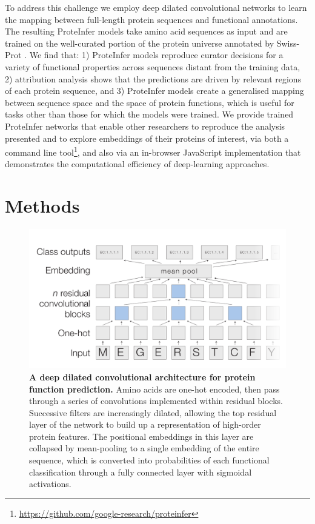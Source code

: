 To address this challenge we employ deep dilated convolutional networks to learn the mapping between full-length protein sequences and functional annotations. The resulting ProteInfer models take amino acid sequences as input and are trained on the well-curated portion of the protein universe annotated by Swiss-Prot \cite{uniprotlatest}. We find that: 1) ProteInfer models reproduce curator decisions for a  variety of functional properties across sequences distant from the training data, 2) attribution analysis shows that the predictions are driven by relevant regions of each protein sequence, and 3) ProteInfer models create a generalised mapping between sequence space and the space of protein functions, which is useful for tasks other than those for which the models were trained. We provide trained ProteInfer networks that enable other researchers to reproduce the analysis presented and to explore embeddings of their proteins of interest, via both a command line tool\footnote{\url{https://github.com/google-research/proteinfer}}, and also via an in-browser JavaScript implementation that demonstrates the computational efficiency of deep-learning approaches.
\section*{Methods}
\begin{figure}[h!]
\centering
  \includegraphics[width=\columnwidth]{Figures/figure.pdf}%
  \caption{\textbf{A deep dilated convolutional architecture for protein function prediction.} Amino acids are one-hot encoded, then pass through a series of convolutions implemented within residual blocks. Successive filters are increasingly dilated, allowing the top residual layer of the network to build up a representation of high-order protein features. The positional embeddings in this layer are collapsed by mean-pooling to a single embedding of the entire sequence, which is converted into probabilities of each functional classification through a fully connected layer with sigmoidal activations. }
  \label{architecture}
\end{figure}
